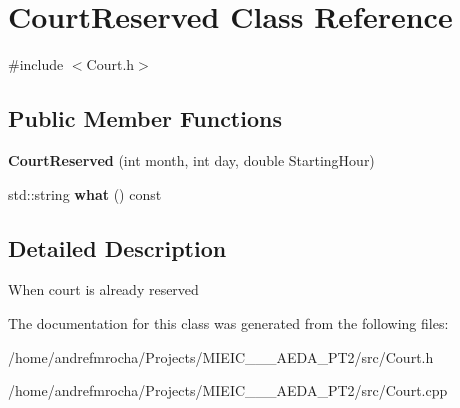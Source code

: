 \hypertarget{class_court_reserved}{}\section{Court\+Reserved Class Reference}
\label{class_court_reserved}


{\ttfamily \#include $<$Court.\+h$>$}

\subsection*{Public Member Functions}
\begin{DoxyCompactItemize}
\item 
\mbox{\label{class_court_reserved_a841e91cf714463cf47a20be9b8d32752}} 
{\bfseries Court\+Reserved} (int month, int day, double Starting\+Hour)
\item 
\mbox{\label{class_court_reserved_a3f86a29ee125b95d68c4ee9ea6163e4e}} 
std\+::string {\bfseries what} () const
\end{DoxyCompactItemize}


\subsection{Detailed Description}
When court is already reserved 

The documentation for this class was generated from the following files\+:\begin{DoxyCompactItemize}
\item 
/home/andrefmrocha/\+Projects/\+M\+I\+E\+I\+C\+\_\+\_\+\_\+\+A\+E\+D\+A\+\_\+\+P\+T2/src/Court.\+h\item 
/home/andrefmrocha/\+Projects/\+M\+I\+E\+I\+C\+\_\+\_\+\_\+\+A\+E\+D\+A\+\_\+\+P\+T2/src/Court.\+cpp\end{DoxyCompactItemize}
